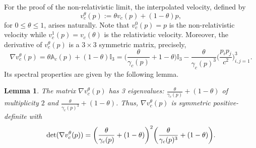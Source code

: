 \documentclass[reqno, 11pt, letterpaper]{amsart}
\newtheorem{lemma}[theorem]{Lemma}
\theoremstyle{remark}
\numberwithin{equation}{section}
\numberwithin{theorem}{section}
\numberwithin{table}{section}
\numberwithin{figure}{section}
\begin{document}
For the proof of the non-relativistic limit, the interpolated velocity, defined by
\begin{equation}\label{eq: interpolated velocity}
v_c^\theta(p):=\theta v_c(p)+(1-\theta)p,
\end{equation}
for $0\leq\theta\leq 1$,
arises naturally. Note that $v_c^0(p)=p$ is the non-relativistic velocity while $v_c^1(p)=v_c(\theta)$ is the relativistic velocity. Moreover, the derivative of $v_c^\theta(p)$ is a $3\times3$ symmetric matrix, precisely,
$$\nabla v_c^\theta(p)=\theta\mathbb{A}_c(p)+(1-\theta)\mathbb{I}_3=\bigg(\frac{\theta}{\gamma_c(p)}+1-\theta\bigg)\mathbb{I}_3-\frac{\theta}{\gamma_c(p)^3}\bigg(\frac{p_i p_j}{c^2}\bigg)_{i,j=1}^3.$$
Its spectral properties are given by the following lemma.


\begin{lemma}\label{lemma: Ac eigenvalues}
The matrix $\nabla v_c^\theta(p)$ has 3 eigenvalues: $\frac{\theta}{\gamma_c(p)}+(1-\theta)$ of multiplicity $2$ and $\frac{\theta}{\gamma_c(p)^3}+(1-\theta)$. Thus, $\nabla v_c^\theta(p)$ is symmetric positive-definite with
$$\textup{det}(\nabla v_c^\theta(p))=\bigg(\frac{\theta}{\gamma_c(p)}+(1-\theta)\bigg)^2\bigg(\frac{\theta}{\gamma_c(p)^3}+(1-\theta)\bigg).$$ 
\end{lemma}
\end{document}
